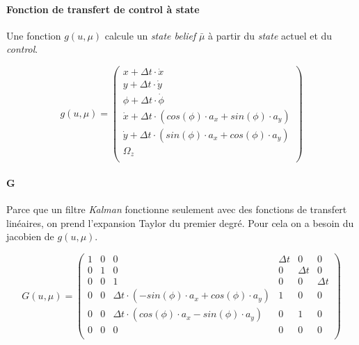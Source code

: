 \documentclass[a4paper]{paper}
\begin{document}
\paragraph{Fonction de transfert de control à state}

Une fonction $ g \left(u, \mu \right) $ calcule un \emph{state belief}
$ \bar{\mu} $ à partir du \emph{state} actuel et du \emph{control}.

\begin{equation}
    g \left(u, \mu \right) =
    \left( \begin{array}{l}
        x + \Delta t \cdot \dot{x} \\
        y + \Delta t \cdot \dot{y} \\
        \phi + \Delta t \cdot \dot{\phi} \\
        \dot{x} + \Delta t \cdot (cos(\phi) \cdot a_x + sin(\phi) \cdot a_y) \\
        \dot{y} + \Delta t \cdot (sin(\phi) \cdot a_x + cos(\phi) \cdot a_y) \\
        \Omega_z \\
    \end{array} \right)
    \label{g}
\end{equation}

\paragraph{G}

Parce que un filtre \emph{Kalman} fonctionne seulement avec des fonctions de transfert
linéaires, on prend l'expansion Taylor du premier degré. Pour cela on a besoin
du jacobien de $ g(u, \mu) $.

\begin{equation}
    G \left(u, \mu \right) =
    \left( \begin{array}{cccccc}
        1 & 0 & 0 & \Delta t & 0 & 0\\
        0 & 1 & 0 & 0 & \Delta t & 0\\
        0 & 0 & 1 & 0 & 0 & \Delta t\\
        0 & 0 & \Delta t \cdot (-sin(\phi) \cdot a_x + cos(\phi) \cdot a_y) & 1 & 0 & 0 \\
        0 & 0 & \Delta t \cdot ( cos(\phi) \cdot a_x - sin(\phi) \cdot a_y) & 0 & 1 & 0 \\
        0 & 0 & 0 & 0 & 0 & 0 \\
    \end{array} \right)
    \label{G}
\end{equation}
\end{document}

